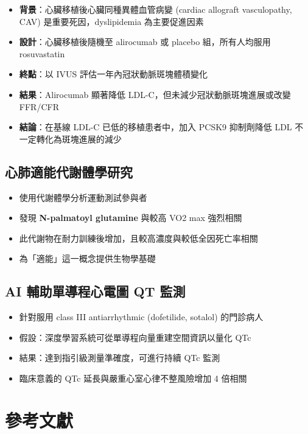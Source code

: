 \documentclass[12pt,a4paper]{article}
\begin{document}
\begin{itemize}
    \item \textbf{背景}：心臟移植後心臟同種異體血管病變 (cardiac allograft vasculopathy, CAV) 是重要死因，dyslipidemia 為主要促進因素
    \item \textbf{設計}：心臟移植後隨機至 alirocumab 或 placebo 組，所有人均服用 rosuvastatin
    \item \textbf{終點}：以 IVUS 評估一年內冠狀動脈斑塊體積變化
    \item \textbf{結果}：Alirocumab 顯著降低 LDL-C，但未減少冠狀動脈斑塊進展或改變 FFR/CFR
    \item \textbf{結論}：在基線 LDL-C 已低的移植患者中，加入 PCSK9 抑制劑降低 LDL 不一定轉化為斑塊進展的減少
\end{itemize}

\subsection{心肺適能代謝體學研究}

\begin{itemize}
    \item 使用代謝體學分析運動測試參與者
    \item 發現 \textbf{N-palmatoyl glutamine} 與較高 VO2 max 強烈相關
    \item 此代謝物在耐力訓練後增加，且較高濃度與較低全因死亡率相關
    \item 為「適能」這一概念提供生物學基礎
\end{itemize}

\subsection{AI 輔助單導程心電圖 QT 監測}

\begin{itemize}
    \item 針對服用 class III antiarrhythmic (dofetilide, sotalol) 的門診病人
    \item 假設：深度學習系統可從單導程向量重建空間資訊以量化 QTc
    \item 結果：達到指引級測量準確度，可進行持續 QTc 監測
    \item 臨床意義的 QTc 延長與嚴重心室心律不整風險增加 4 倍相關
\end{itemize}

\section{參考文獻}
\end{document}
